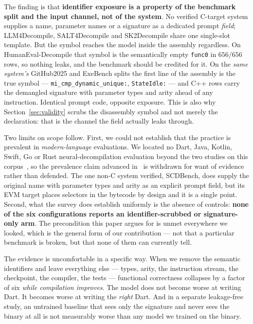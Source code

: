 \documentclass[conference]{IEEEtran}
\begin{document}
The finding is that \textbf{identifier exposure is a property of the benchmark
split and the input channel, not of the system}. No verified C-target system
supplies a name, parameter names or a signature as a dedicated prompt
\emph{field}; LLM4Decompile, SALT4Decompile and SK2Decompile share one
single-slot template. But the symbol reaches the model inside the assembly
regardless. On HumanEval-Decompile that symbol is the semantically empty
\texttt{func0} in $656/656$ rows, so nothing leaks, and the benchmark should be
credited for it. On the \emph{same system's} GitHub2025 and ExeBench splits the
first line of the assembly is the true symbol ---
\texttt{mi\_cmp\_dynamic\_unique:}, \texttt{StateIdle:} --- and C++ rows carry the
demangled signature with parameter types and arity ahead of any instruction.
Identical prompt code, opposite exposure. This is also why
Section~\ref{sec:validity} scrubs the disassembly symbol and not merely the
declaration: that is the channel the field actually leaks through.

Two limits on scope follow. First, we could not establish that the
practice is prevalent in \emph{modern-language} evaluations. We located no Dart,
Java, Kotlin, Swift, Go or Rust neural-decompilation evaluation beyond the two
studies on this corpus~\cite{abualazm2026idiomatic,abualazm2026tosem}, so the
prevalence claim advanced in~\cite{abualazm2026tosem} is withdrawn for want of
evidence rather than defended. The one non-C system verified, SCDBench, does
supply the original name with parameter types and arity as an explicit prompt
field, but its EVM target places selectors in the bytecode by design and it is a
single point. Second, what the survey does establish uniformly is the absence of
controls: \textbf{none of the six configurations reports an identifier-scrubbed or
signature-only arm}. The precondition this paper argues for is unmet everywhere we
looked, which is the general form of our contribution --- not that a particular
benchmark is broken, but that none of them can currently tell.

The evidence is uncomfortable in a specific way. When we remove the semantic
identifiers and leave everything else --- types, arity, the instruction stream,
the checkpoint, the compiler, the tests --- functional correctness collapses by a
factor of six \emph{while compilation improves}. The model does not become worse
at writing Dart. It becomes worse at writing the \emph{right} Dart. And in a
separate leakage-free study, an untrained baseline that sees only the signature
and never sees the binary at all is not measurably worse than any model we
trained on the binary.
\end{document}
